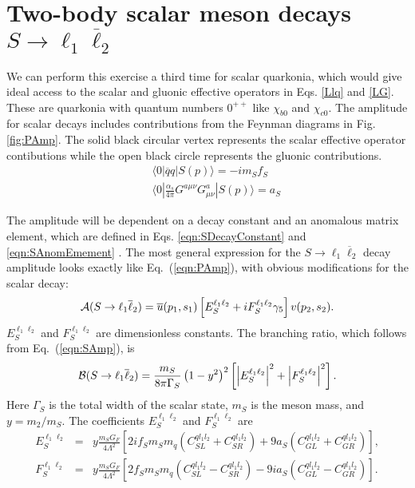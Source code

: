 \documentclass[12pt]{article}
\begin{document}
\section{Two-body scalar meson decays $S \to \ell_1 \overline \ell_2$}

We can perform this exercise a third time for scalar quarkonia, which would give ideal access to the scalar and gluonic effective operators in Eqs. \ref{Llq} and \ref{LG}.  These are quarkonia with quantum numbers $0^{++}$ like $\chi_{b0}$ and $\chi_{c0}$.  The amplitude for scalar decays includes contributions from the Feynman diagrams in Fig. \ref{fig:PAmp}.  The solid black circular vertex represents the scalar effective operator contibutions while the open black circle represents the gluonic contributions.
%
\begin{eqnarray}\label{eqn:}
&&  \langle 0| \overline q q | S(p) \rangle = -i m_S f_S  \label{eqn:SDecayConstant} \\
&& \langle 0| \frac{\alpha_s}{4\pi} G^{a\mu\nu} G^a_{\mu\nu}  | S(p) \rangle = a_S \label{eqn:SAnomEmement}
\end{eqnarray}

The amplitude will be dependent on a decay constant and an anomalous matrix element, which are defined in Eqs. \ref{eqn:SDecayConstant} and \ref{eqn:SAnomEmement} \cite{Godfrey:2015vda}.  The most general expression for the $S \to \ell_1 \overline \ell_2$ decay amplitude looks exactly like 
Eq.~(\ref{eqn:PAmp}), with obvious modifications for the scalar decay:
%
\begin{eqnarray}\label{eqn:SAmp}
{\cal A}(S\to \ell_1 \overline \ell_2) = \overline{u}(p_1, s_1) \left[
E_S^{\ell_1\ell_2}  + i F_S^{\ell_1\ell_2} \gamma_5 
\right] v(p_2,s_2) .
\end{eqnarray}
%
$E_S^{\ell_1\ell_2}$ and $F_S^{\ell_1\ell_2}$ are dimensionless constants. The branching ratio, which follows from 
Eq.~(\ref{eqn:SAmp}), is
%
\begin{eqnarray}\label{BRSpin0S}
{\cal B}(S \to \ell_1 \overline \ell_2) = \frac{m_S}{8\pi \Gamma_S} \left(1-y^2\right)^2
\left[\left|E_S^{\ell_1\ell_2}\right|^2 + \left|F_S^{\ell_1\ell_2}\right|^2\right].
\end{eqnarray}
%
Here $\Gamma_S$ is the total width of the scalar state, $m_S$ is the meson mass, and $y = m_2/m_S$. 
The coefficients $E_S^{\ell_1\ell_2}$ and $F_S^{\ell_1\ell_2}$  are
% 
\begin{eqnarray}\label{SCoef1}
E_S^{\ell_1\ell_2} &=& y \frac{m_S G_F}{4 \Lambda^2} 
\left[2 i f_{S} m_S m_q \left(C_{SL}^{q l_1 l_2} + C_{SR}^{q l_1 l_2}\right) +
9 a_S \left(C_{GL}^{q l_1 l_2} + C_{GR}^{q l_1 l_2}\right) \right],
\nonumber \\
F_S^{\ell_1\ell_2} &=& y \frac{m_S G_F}{4 \Lambda^2}
 \left[2 f_{S} m_S m_q \left(C_{SL}^{q l_1 l_2} - C_{SR}^{q l_1 l_2}\right) -
9 i a_S \left(C_{GL}^{q l_1 l_2} - C_{GR}^{q l_1 l_2}\right)
\right].
\end{eqnarray}
% 
\end{document}
